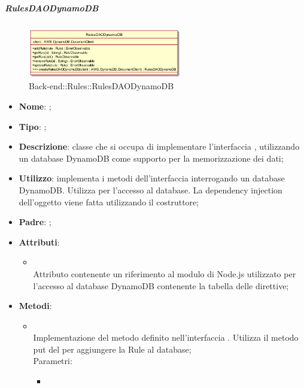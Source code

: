 \hypertarget{RulesDAODynamoDB_label}{\subparagraph{RulesDAODynamoDB}}
\begin{figure}[h]
	\centering
	\includegraphics[width=0.60\textwidth,height=\textheight,keepaspectratio]{images/ClassRulesDAODynamoDB.png}
	\caption{Back-end::Rules::RulesDAODynamoDB}
\end{figure}
\begin{itemize}
	\item \textbf{Nome}: ;
	\item \textbf{Tipo}: ;
	\item \textbf{Descrizione}: classe che si occupa di implementare l'interfaccia , utilizzando un database DynamoDB come supporto per la memorizzazione dei dati;
	\item \textbf{Utilizzo}: implementa i metodi dell'interfaccia  interrogando un database DynamoDB. Utilizza  per l'accesso al database. La dependency injection dell'oggetto  viene fatta utilizzando il costruttore;
	\item \textbf{Padre}: ;
	\item \textbf{Attributi}:
	\begin{itemize}
		\item[]  \\
		Attributo contenente un riferimento al modulo di Node.js utilizzato per l'accesso al database DynamoDB contenente la tabella delle direttive;
	\end{itemize}
	\item \textbf{Metodi}:
	\begin{itemize}
		\item[]  \\		Implementazione del metodo definito nell'interfaccia . Utilizza il metodo put del  per aggiungere la Rule al database;\\
		Parametri:
		\begin{itemize}
			\item {} \\

\end{itemize}
\end{itemize}
\end{itemize}

